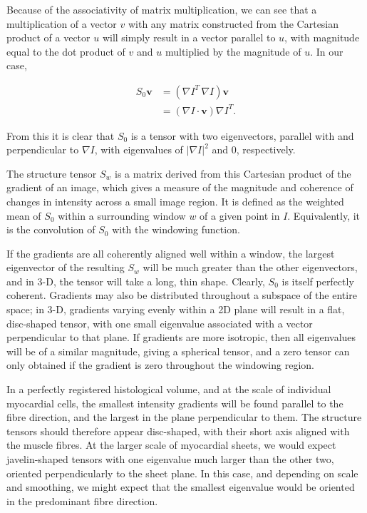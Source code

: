     Because of the associativity of matrix multiplication, we can see that a multiplication of a vector $v$ with any matrix constructed from the Cartesian product of a vector $u$ will simply result in a vector parallel to $u$, with magnitude equal to the dot product of $v$ and $u$ multiplied by the magnitude of $u$. In our case,
  
    \begin{align}
      S_0 \mathbf{v} &= (\nabla I^T \, \nabla I) \mathbf{v} \\
                     &= (\nabla I \cdot \mathbf{v}) \nabla I^T.
    \end{align}
  
    From this it is clear that $S_0$ is a tensor with two eigenvectors, parallel with and perpendicular to $\nabla I$, with eigenvalues of $|\nabla I|^2$ and 0, respectively.
  
    The structure tensor $S_w$ is a matrix derived from this Cartesian product of the gradient of an image, which gives a measure of the magnitude and coherence of changes in intensity across a small image region. It is defined as the weighted mean of $S_0$ within a surrounding window $w$ of a given point in $I$. Equivalently, it is the convolution of $S_0$ with the windowing function.
  
    If the gradients are all coherently aligned well within a window, the largest eigenvector of the resulting $S_w$ will be much greater than the other eigenvectors, and in 3-D, the tensor will take a long, thin shape. Clearly, $S_0$ is itself perfectly coherent. Gradients may also be distributed throughout a subspace of the entire space; in 3-D, gradients varying evenly within a 2D plane will result in a flat, disc-shaped tensor, with one small eigenvalue associated with a vector perpendicular to that plane. If gradients are more isotropic, then all eigenvalues will be of a similar magnitude, giving a spherical tensor, and a zero tensor can only obtained if the gradient is zero throughout the windowing region.
  
    In a perfectly registered histological volume, and at the scale of individual myocardial cells, the smallest intensity gradients will be found parallel to the fibre direction, and the largest in the plane perpendicular to them. The structure tensors should therefore appear disc-shaped, with their short axis aligned with the muscle fibres. At the larger scale of myocardial sheets, we would expect javelin-shaped tensors with one eigenvalue much larger than the other two, oriented perpendicularly to the sheet plane. In this case, and depending on scale and smoothing, we might expect that the smallest eigenvalue would be oriented in the predominant fibre direction.
